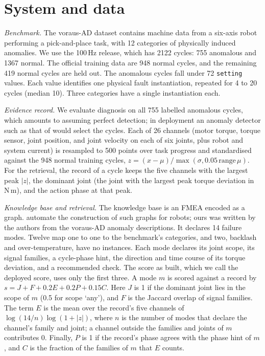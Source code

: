 \documentclass{ifacconf}
\begin{document}
\section{System and data}
\label{sec:system}

\emph{Benchmark.} The voraus-AD dataset \citep{voraus} contains machine data
from a six-axis robot performing a pick-and-place task, with 12 categories of
physically induced anomalies. We use the 100\,Hz release, which has 2122 cycles:
755 anomalous and 1367 normal. The official training data are 948 normal cycles,
and the remaining 419 normal cycles are held out. The anomalous cycles fall
under 72 \texttt{setting} values. Each value identifies one physical fault
instantiation, repeated for 4 to 20 cycles (median 10). Three categories have a
single instantiation each.

\emph{Evidence record.} We evaluate diagnosis on all 755 labelled anomalous
cycles, which amounts to assuming perfect detection; in deployment an anomaly
detector such as that of \citet{voraus} would select the cycles. Each of 26
channels (motor torque, torque sensor, joint position, and joint velocity on
each of six joints, plus robot and system current) is resampled to 500 points
over task progress and standardised against the 948 normal training cycles,
$z = (x-\mu)/\max(\sigma, 0.05\,\mathrm{range}\,\mu)$. For the retrieval, the
record of a cycle keeps the five channels with the largest peak $|z|$, the
dominant joint (the joint with the largest peak torque deviation in N\,m), and
the action phase at that peak.

\emph{Knowledge base and retrieval.} The knowledge base is an FMEA encoded as a
graph. \citet{aei_kg} automate the construction of such graphs for robots; ours
was written by the authors from the voraus-AD anomaly descriptions. It declares
14 failure modes. Twelve map one to one to the benchmark's categories, and two,
backlash and over-temperature, have no instances. Each mode declares its joint
scope, its signal families, a cycle-phase hint, the direction and time course of
its torque deviation, and a recommended check. The score as built, which we call
the deployed score, uses only the first three. A mode $m$ is scored against a
record by $s = J + F + 0.2E + 0.2P + 0.15C$. Here $J$ is 1 if the dominant joint
lies in the scope of $m$ (0.5 for scope `any'), and $F$ is the Jaccard overlap
of signal families. The term $E$ is the mean over the record's five channels of
$\log(14/n)\log(1+|z|)$, where $n$ is the number of modes that declare the
channel's family and joint; a channel outside the families and joints of $m$
contributes 0. Finally, $P$ is 1 if the record's phase agrees with the phase
hint of $m$, and $C$ is the fraction of the families of $m$ that $E$ counts.
\end{document}
